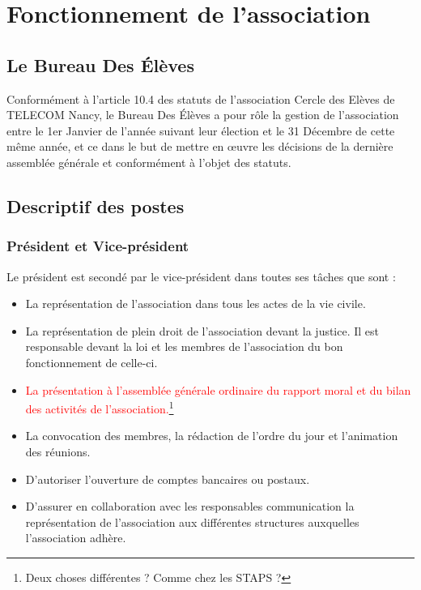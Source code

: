 \documentclass{article} %
\begin{document}
	\section{Fonctionnement de l’association}

		\subsection{Le Bureau Des Élèves}

			Conformément à l’article 10.4 des statuts de l’association Cercle
			des Elèves de TELECOM Nancy, le Bureau Des Élèves a pour rôle la
			gestion de l'association entre le 1er Janvier de l’année suivant
			leur élection et le 31 Décembre de cette même année, et ce dans le
			but de mettre en œuvre les décisions de la dernière assemblée
			générale et conformément à l'objet des statuts.

		\subsection{Descriptif des postes}

			\subsubsection{Président et Vice-président}

				Le président est secondé par le vice-président dans toutes ses
				tâches que sont :
				\begin{itemize}
					\item La représentation de l’association dans tous les actes
						de la vie civile.
					\item La représentation de plein droit de l’association
						devant la justice. Il est responsable devant la loi et
						les membres de l’association du bon fonctionnement de
						celle-ci.
					\item \textcolor{red}{La présentation à l’assemblée générale
						ordinaire du rapport moral et du bilan des activités de
						l’association.}\footnote{Deux choses différentes ? Comme
						chez les STAPS ?}
					\item La convocation des membres, la rédaction de l’ordre du
						jour et l’animation des réunions.
					\item D’autoriser l’ouverture de comptes bancaires ou
						postaux.
					\item D’assurer en collaboration avec les responsables
						communication la représentation de l’association aux
						différentes structures auxquelles l’association adhère. 
				\end{itemize}
\end{document}

